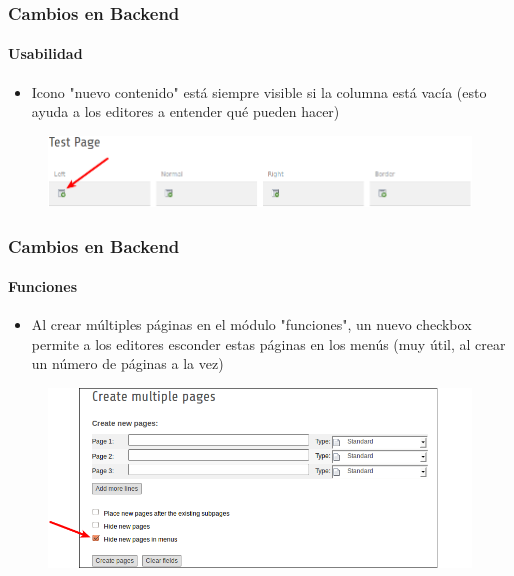
\begin{frame}[fragile]
	\frametitle{Cambios en Backend}
	\framesubtitle{Usabilidad}

 	\begin{itemize}
		\item Icono "nuevo contenido" está siempre visible si la columna está vacía\newline
			\small(esto ayuda a los editores a entender qué pueden hacer)\normalsize
	\end{itemize}

	\begin{figure}
		\includegraphics[width=0.95\linewidth]{Images/BackendChanges/NewContentIconAlwaysVisible.png}
	\end{figure}

\end{frame}


\begin{frame}[fragile]
	\frametitle{Cambios en Backend}
	\framesubtitle{Funciones}

	\begin{itemize}
		\item Al crear múltiples páginas en el módulo "funciones", un nuevo checkbox permite a los editores esconder estas páginas en los menús
			\small(muy útil, al crear un número de páginas a la vez)\normalsize
	\end{itemize}

	\begin{figure}
		\includegraphics[width=0.85\linewidth]{Images/BackendChanges/CreateMultiplePagesHideInMenu.png}
	\end{figure}

\end{frame}

